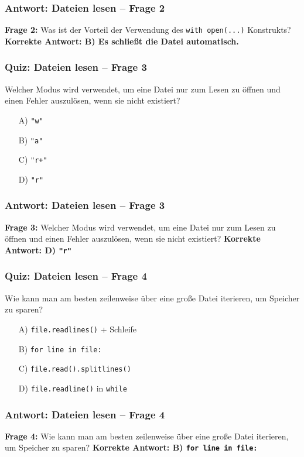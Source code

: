 \documentclass[aspectratio=169]{beamer} %
\begin{document}
\begin{frame}[fragile]
\frametitle{Antwort: Dateien lesen – Frage 2}
\textbf{Frage 2:} Was ist der Vorteil der Verwendung des \texttt{with open(...)} Konstrukts?
\vspace{1em}
\textbf{Korrekte Antwort: B) Es schließt die Datei automatisch.}
\end{frame}

\begin{frame}[fragile]
\frametitle{Quiz: Dateien lesen – Frage 3}
Welcher Modus wird verwendet, um eine Datei nur zum Lesen zu öffnen und einen Fehler auszulösen, wenn sie nicht existiert?
\begin{enumerate}
    \item[A)] \texttt{"w"}
    \item[B)] \texttt{"a"}
    \item[C)] \texttt{"r+"}
    \item[D)] \texttt{"r"}
\end{enumerate}
\end{frame}

\begin{frame}[fragile]
\frametitle{Antwort: Dateien lesen – Frage 3}
\textbf{Frage 3:} Welcher Modus wird verwendet, um eine Datei nur zum Lesen zu öffnen und einen Fehler auszulösen, wenn sie nicht existiert?
\vspace{1em}
\textbf{Korrekte Antwort: D) \texttt{"r"}}
\end{frame}

\begin{frame}[fragile]
\frametitle{Quiz: Dateien lesen – Frage 4}
Wie kann man am besten zeilenweise über eine große Datei iterieren, um Speicher zu sparen?
\begin{enumerate}
    \item[A)] \texttt{file.readlines()} + Schleife
    \item[B)] \texttt{for line in file:}
    \item[C)] \texttt{file.read().splitlines()}
    \item[D)] \texttt{file.readline()} in \texttt{while}
\end{enumerate}
\end{frame}

\begin{frame}[fragile]
\frametitle{Antwort: Dateien lesen – Frage 4}
\textbf{Frage 4:} Wie kann man am besten zeilenweise über eine große Datei iterieren, um Speicher zu sparen?
\vspace{1em}
\textbf{Korrekte Antwort: B) \texttt{for line in file:}}
\end{frame}
\end{document}
